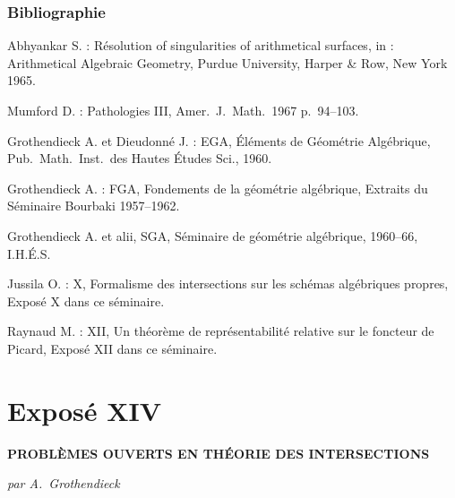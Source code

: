 \subsubsection*{Bibliographie}
\begin{enumerate}[label={[\arabic*]}]
\item[{[1]}] Abhyankar S. : R\'esolution of singularities of arithmetical surfaces, in : Arithmetical Algebraic Geometry, Purdue University, Harper \& Row, New York 1965.
\item[{[2]}] Mumford D. : Pathologies III, Amer.\ J.\ Math.\ 1967 p.\ 94--103.
\item[{[3]}] Grothendieck A. et Dieudonn\'e J. : EGA, \'El\'ements de G\'eom\'etrie Alg\'ebrique, Pub.\ Math.\ Inst.\ des Hautes \'Etudes Sci., 1960.
\item[{[4]}] Grothendieck A. : FGA, Fondements de la g\'eom\'etrie alg\'ebrique, Extraits du S\'eminaire Bourbaki 1957--1962.
\item[{[5]}] Grothendieck A. et alii, SGA, S\'eminaire de g\'eom\'etrie alg\'ebrique, 1960--66, I.H.\'E.S.
\item[{[6]}] Jussila O. : X, Formalisme des intersections sur les sch\'emas alg\'ebriques propres, Expos\'e X dans ce s\'eminaire.
\item[{[7]}] Raynaud M. : XII, Un th\'eor\`eme de repr\'esentabilit\'e relative sur le foncteur de Picard, Expos\'e XII dans ce s\'eminaire.
\end{enumerate}


\newpage
\section*{Expos\'e XIV}

\begin{center}
\Large\textbf{PROBL\`EMES OUVERTS EN TH\'EORIE DES INTERSECTIONS}

\medskip
\normalsize\textit{par A.\ Grothendieck}
\end{center}

\bigskip

